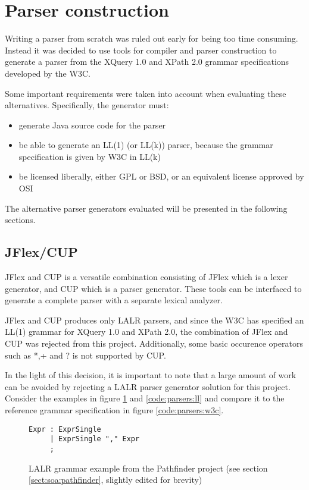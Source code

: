 \section{Parser construction}
\label{sect:method:alternatives}
Writing a parser from scratch was ruled out early for being too time consuming.
Instead it was decided to use tools for compiler and parser construction to
generate a parser from the XQuery 1.0 and XPath 2.0 grammar  
specifications\cite{w3c01} developed by the W3C.

Some important requirements were taken into account when evaluating these
alternatives. Specifically, the generator must:
\begin{itemize}
  \item generate Java source code for the parser
  \item be able to generate an LL(1) (or LL(k)) parser, because the grammar  
  specification is given by W3C in LL(k)
  \item be licensed liberally, either GPL or BSD, or an equivalent license
  approved by OSI
\end{itemize}

The alternative parser generators evaluated will be presented in the following sections.

\subsection{JFlex/CUP}
JFlex and CUP is a versatile combination consisting of JFlex which is a lexer
generator, and CUP which is a parser generator. These tools can be interfaced to
generate a complete parser with a separate lexical analyzer.

JFlex and CUP produces only LALR parsers, and since the W3C has specified an
LL(1) grammar for XQuery 1.0 and XPath 2.0, the combination of JFlex and CUP was
rejected from this project. Additionally, some basic occurence operators such as
*,+ and ? is not supported by CUP.

In the light of this decision, it is important to note that a large amount of
work can be avoided by rejecting a LALR parser generator solution for this
project. Consider the examples in figure \ref{code:parsers:lalr} and
\ref{code:parsers:ll} and compare it to the reference grammar specification in
figure \ref{code:parsers:w3c}.

\begin{figure}[h!]
\begin{Verbatim}
Expr : ExprSingle
     | ExprSingle "," Expr
     ;
\end{Verbatim}
\caption[LALR grammar example]{LALR grammar example from the Pathfinder project
(see section \ref{sect:soa:pathfinder}, slightly edited for brevity)}
\label{code:parsers:lalr}
\end{figure}

